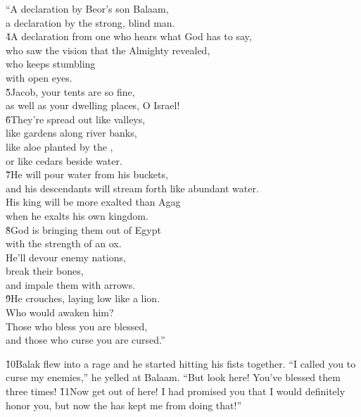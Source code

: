 \begin{poetry}
\poeml ``A declaration by Beor's son Balaam, \\
\poemll    a declaration by the strong, blind man. \\
\poeml \v{4}A declaration from one who hears what God has to say, \\
\poemll    who saw the vision that the Almighty revealed, \\
\poeml who keeps stumbling \\
\poemll    with open eyes. \\
\poeml \v{5}Jacob, your tents are so fine, \\
\poemll    as well as your dwelling places, O Israel! \\
\poeml \v{6}They're spread out like valleys, \\
\poemll    like gardens along river banks, \\
\poeml like aloe planted by the , \\
\poemll    or like cedars beside water. \\
\poeml \v{7}He will pour water from his buckets, \\
\poemll    and his descendants will stream forth like abundant water. \\
\poeml His king will be more exalted than Agag \\
\poemll    when he exalts his own kingdom. \\
\poeml \v{8}God is bringing them out of Egypt \\
\poemll    with the strength of an ox. \\
\poeml He'll devour enemy nations, \\
\poemll    break their bones, \\
\poemlll       and impale them with arrows. \\
\poeml \v{9}He crouches, laying low like a lion. \\
\poemll    Who would awaken him? \\
\poeml Those who bless you are blessed, \\
\poemll    and those who curse you are cursed.''
\end{poetry}

\v{10}Balak flew into a rage and he started hitting his fists together. ``I called you to curse my enemies,'' he yelled at Balaam. ``But look here! You've blessed them three times! \v{11}Now get out of here! I had promised you that I would definitely honor you, but now the  has kept me from doing that!''

